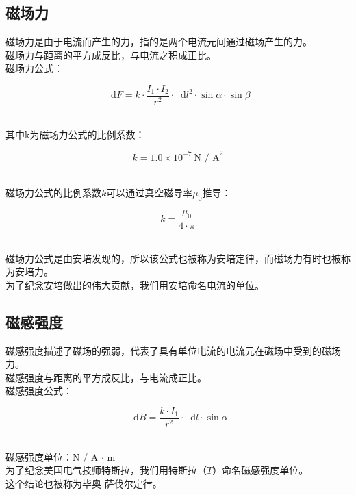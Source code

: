 \documentclass[UTF8]{ctexart}
\newcommand*{\dif}{\mathop{}\!\mathrm{d}}
\begin{document}
\subsection{磁场力}
    磁场力是由于电流而产生的力，指的是两个电流元间通过磁场产生的力。\\[2mm]
    磁场力与距离的平方成反比，与电流之积成正比。\\[3mm]
    磁场力公式：
    \begin{large}
        \begin{equation*}
            \dif F=k\cdot\frac{I_1 \cdot I_2}{r^2}\cdot \dif l^2\cdot\sin{\alpha}\cdot\sin{\beta}
        \end{equation*}
    \end{large}\\
    其中k为磁场力公式的比例系数：
    \begin{large}
        \begin{equation*}
            k=1.0\times 10^{-7}~\text{N / A}^2
        \end{equation*}
    \end{large}\\
    磁场力公式的比例系数$k$可以通过真空磁导率$\mu_0$推导：
    \begin{large}
        \begin{equation*}
            k=\dfrac{\mu_0}{4\cdot\pi}
        \end{equation*}
    \end{large}\\
    磁场力公式是由安培发现的，所以该公式也被称为安培定律，而磁场力有时也被称为安培力。\\[3mm]
    为了纪念安培做出的伟大贡献，我们用安培命名电流的单位。\\

\subsection{磁感强度}
    磁感强度描述了磁场的强弱，代表了具有单位电流的电流元在磁场中受到的磁场力。\\[1mm]
    磁感强度与距离的平方成反比，与电流成正比。\\[3mm]
    磁感强度公式：
    \begin{large}
        \begin{equation*}
            \dif B = \dfrac{k \cdot I_{1}}{{r}^{2}}\cdot \dif l\cdot\sin{\alpha}
        \end{equation*}
    \end{large}\\
    磁感强度单位：N / A $\cdot$ m\\[3mm]
    为了纪念美国电气技师特斯拉，我们用特斯拉（$T$）命名磁感强度单位。\\[6mm]
    这个结论也被称为毕奥-萨伐尔定律。
\end{document}
